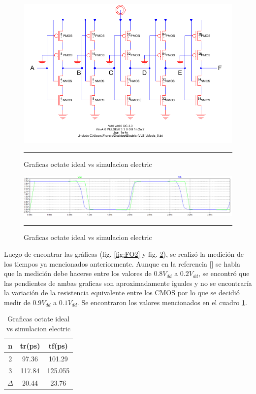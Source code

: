 \documentclass[12pt,a4paper]{article} %
\begin{document}
\begin{figure}[htbp]
  \centering
    \includegraphics[scale=0.5]{./CircuitoFO2.png}
    \rule{35em}{0.5pt}
  \caption[Captura]{Graficas octate ideal vs simulacion electric}
  \label{fig:CircuitoFO3}
\end{figure}

\begin{figure}[htbp]
  \centering
    \includegraphics[scale=0.4]{./FO3.png}
    \rule{35em}{0.5pt}
  \caption[Captura]{Graficas octate ideal vs simulacion electric}
  \label{fig:FO3}
\end{figure}

Luego de encontrar las gráficas (fig. \ref{fig:FO2} y fig. \ref{fig:FO3}), se realizó la medición de los tiempos ya mencionados anteriormente. Aunque en la referencia [] se habla que la medición debe hacerse entre los valores de $0.8V_{dd}$ a $0.2V_{dd}$, se encontró que las pendientes de ambas graficas son aproximadamente iguales y no se encontraría la variación de la resistencia equivalente entre los CMOS por lo que se decidió medir de $0.9V_{dd}$ a $0.1V_{dd}$. Se encontraron los valores mencionados en el cuadro \ref{table:tiempos}. 

\begin{table}\label{table:tiempos}
\begin{center}
\begin{tabular}{c||c||c}
n & tr(ps) & tf(ps)\\
\hline
\hline
2 & 97.36 & 101.29 \\
3 & 117.84 & 125.055 \\
$\Delta$ & 20.44 & 23.76\\
\hline
\end{tabular}
\caption{Graficas octate ideal vs simulacion electric}
\end{center}
\end{table}
\end{document}
